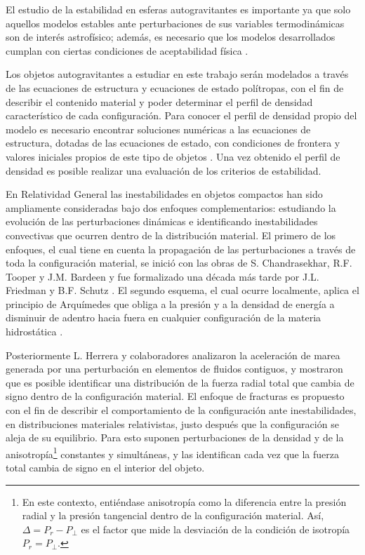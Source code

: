 \documentclass[letterpaper,11pt]{article}
\begin{document}
El estudio de la estabilidad en esferas autogravitantes es importante ya que solo aquellos modelos estables ante perturbaciones de sus variables termodinámicas son de interés astrofísico; además, es necesario que los modelos desarrollados cumplan con ciertas condiciones de aceptabilidad física \cite{ivanov2017analytical}.

Los objetos autogravitantes a estudiar en este trabajo serán modelados a través de las ecuaciones de estructura y ecuaciones de estado polítropas, con el fin de describir el contenido material y poder determinar el perfil de densidad característico de cada configuración. Para conocer el perfil de densidad propio del modelo es necesario encontrar soluciones numéricas a las ecuaciones de estructura, dotadas de las ecuaciones de estado, con condiciones de frontera y valores iniciales propios de este tipo de objetos \cite{silbar2005erratum}. Una vez obtenido el perfil de densidad es posible realizar una evaluación de los criterios de estabilidad.
    
En Relatividad General las inestabilidades en objetos compactos han sido ampliamente consideradas bajo dos enfoques complementarios: estudiando la evolución de las perturbaciones dinámicas e identificando inestabilidades convectivas que ocurren dentro de la distribución material. El primero de los enfoques, el cual tiene en cuenta la propagación de las perturbaciones a través de toda la configuración material, se inició con las obras de S. Chandrasekhar, R.F. Tooper y J.M. Bardeen \cite{chandrasekhar1964a,chandrasekhar1964b,Tooper1965,tooper1964stability,Bardeen1965} y fue formalizado una década más tarde por J.L. Friedman y B.F. Schutz \cite{FriedmanSchutz1975}. El segundo esquema, el cual ocurre localmente, aplica el principio de Arquímedes que obliga a la presión y a la densidad de energía a disminuir de adentro hacia fuera en cualquier configuración de la materia hidrostática \cite{Bondi1964B,Thorne1966,Kovetz1967}.

Posteriormente L. Herrera y colaboradores \cite{Herrera1992,DiPrisco1994,DiPrisco1997} analizaron la aceleración de marea generada por una perturbación en elementos de fluidos contiguos, y mostraron que es posible identificar una distribución de la fuerza radial total     que cambia de signo dentro de la configuración material. El enfoque de fracturas es propuesto con el fin de describir el comportamiento de la configuración ante inestabilidades, en distribuciones materiales relativistas, justo después que la configuración se aleja de su  equilibrio. Para esto suponen perturbaciones de la densidad y de la anisotropía\footnote{En este contexto, entiéndase anisotropía como la diferencia entre la presión radial y la presión tangencial dentro de la configuración material. Así, $\Delta = P_{r} - P_{\perp}$ es el factor que mide la desviación de la condición de isotropía $P_{r} = P_{\perp}$.} constantes y simultáneas, y las identifican cada vez que la fuerza total cambia de signo en el interior del objeto.  
\end{document}
